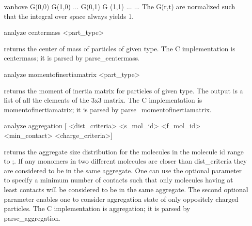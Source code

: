 { vanhove { { G(0,0) G(1,0) ... } { G(0,1) G (1,1) ... } ... }	
The G(r,t) are normalized such that the integral over space always yields 1.

\begin{tclcode}
 analyze centermass { <part_type> } 
\end{tclcode}
returns the center of mass of particles of given type. The C implementation is centermass; it is parsed by parse\_centermass.

\begin{tclcode}
 analyze momentofinertiamatrix { <part_type> } 
\end{tclcode}
returns the moment of inertia matrix for particles of given type. The output is a list of all the elements of the 3x3 matrix. The C implementation is momentofinertiamatrix; it is parsed by parse\_momentofinertiamatrix.

\begin{tclcode}
 analyze aggregation [{ <dist_criteria> <s_mol_id>
   	 <f_mol_id> <min_contact> <charge_criteria>}] 
\end{tclcode}
returns the aggregate size distribution for the molecules in the molecule id range  to ;. If any monomers in two different molecules are closer than dist\_criteria they are considered to be in the same aggregate. One can use the optional  parameter to specify a minimum number of contacts such that only molecules having at least  contacts will be considered to be in the same aggregate. The second optional parameter  enables one to consider aggregation state of only oppositely charged particles. The C implementation is aggregation; it is parsed by parse\_aggregation.

}
